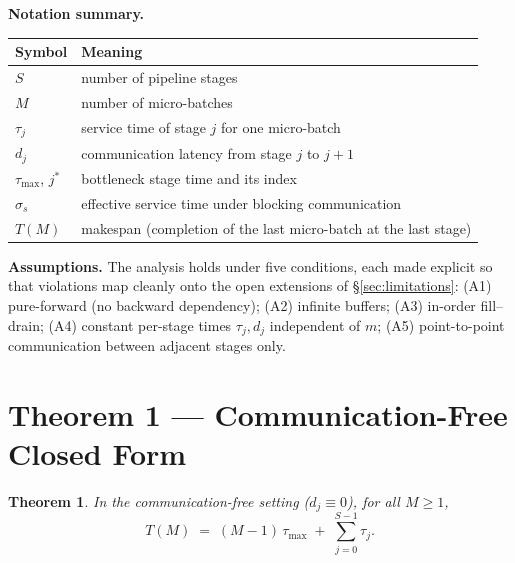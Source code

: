 \documentclass[11pt]{article}
\newtheorem{theorem}{Theorem}
\begin{document}
\textbf{Notation summary.}

\begin{center}
\begin{tabular}{ll}
\toprule
Symbol & Meaning \\
\midrule
$S$ & number of pipeline stages \\
$M$ & number of micro-batches \\
$\tau_j$ & service time of stage $j$ for one micro-batch \\
$d_j$ & communication latency from stage $j$ to $j+1$ \\
$\tau_{\max}$, $j^*$ & bottleneck stage time and its index \\
$\sigma_s$ & effective service time under blocking communication \\
$T(M)$ & makespan (completion of the last micro-batch at the last stage) \\
\bottomrule
\end{tabular}
\end{center}

\textbf{Assumptions.} The analysis holds under five conditions, each made explicit so that violations map cleanly onto the open extensions of \S\ref{sec:limitations}: (A1) pure-forward (no backward dependency); (A2) infinite buffers; (A3) in-order fill--drain; (A4) constant per-stage times $\tau_j,d_j$ independent of $m$; (A5) point-to-point communication between adjacent stages only.

\section{Theorem 1 --- Communication-Free Closed Form}\label{sec:thm1}

\begin{theorem}\label{thm:1}
In the communication-free setting ($d_j\equiv 0$), for all $M\ge 1$,
\[
T(M) \;=\; (M-1)\,\tau_{\max} \;+\; \sum_{j=0}^{S-1}\tau_j .
\]
\end{theorem}
\end{document}
